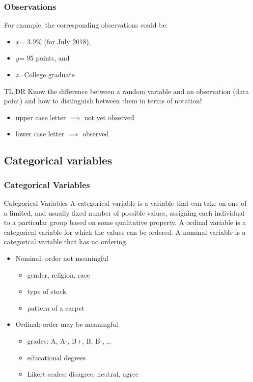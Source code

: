 \documentclass[handout]{beamer}
\begin{document}
\begin{frame}
\frametitle{Observations}

For example, the corresponding \alert{observations} could be:
\begin{itemize}
\item $x$= 3.9\% (for July 2018),
\item $y$= 95 points, and
\item $z$=College graduate
\end{itemize}

\vspace{1cm} \pause

\alert{TL;DR} 
Know the difference between a random variable and an observation (data point)
\pause
and how to distinguish between them in terms of notation!
\begin{itemize}
\item upper case letter $\implies$ not yet observed
\item lower case letter $\implies$ observed
\end{itemize}
\end{frame}








\subsection{Categorical variables}
\begin{frame}
\frametitle{Categorical Variables}

\begin{definition}{Categorical Variables}
A \alert{categorical variable} is a variable that can take on one of a limited, 
and usually fixed number of possible values, 
assigning each individual to a particular group based on some qualitative property.
\pause
A \alert{ordinal variable} is a categorical variable for which the values can
be ordered.
\pause
A \alert{nominal variable} is a categorical variable that has no ordering.
\end{definition}

\pause

\begin{itemize}[<+->]
\item Nominal: order not meaningful
  \begin{itemize}
  \item gender, religion, race
  \item type of stock
  \item pattern of a carpet
  \end{itemize}
\item Ordinal: order may be meaningful
  \begin{itemize}
  \item grades: A, A-, B+, B, B-, \ldots
  \item educational degrees
  \item Likert scales: disagree, neutral, agree
  \end{itemize}
\end{itemize}
\end{frame}
\end{document}

